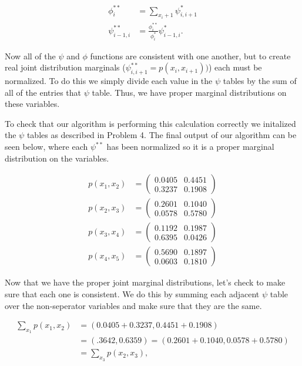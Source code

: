 \documentclass[paper=a4, fontsize=11pt]{scrartcl} %
\begin{document}
\begin{align}
\phi_i^{**} &= \sum_{x_{i}+1} \psi_{i,i+1}^{*} \\
\psi_{i-1,i}^{**} &= \frac{\phi_i^{**}}{\phi_i^*}\psi_{i-1,i}^*.
\end{align}

Now all of the $\psi$ and  $\phi$ functions are consistent with one another, but to create real joint distribution marginals ($\psi^{**}_{i,i+1} = p(x_i,x_{i+1}))$) each must be normalized.
To do this we simply divide each value in the $\psi$ tables by the sum of all of the entries that $\psi$ table.
Thus, we have proper marginal distributions on these variables.

To check that our algorithm is performing this calculation correctly we initalized the $\psi$ tables as described in Problem 4.
The final output of our algorithm can be seen below, where each $\psi^{**}$ has been normalized so it is a proper marginal distribution on the variables.

\begin{align}
p(x_1,x_2) &=
	\begin{pmatrix}
	0.0405 & 0.4451 \\
	0.3237 & 0.1908
	\end{pmatrix} \\
p(x_2,x_3) &=
	\begin{pmatrix}
	0.2601 & 0.1040 \\
    	0.0578 & 0.5780
	\end{pmatrix} \\
p(x_3,x_4) &=
	\begin{pmatrix}
	0.1192  &  0.1987 \\
    	0.6395   & 0.0426
	\end{pmatrix} \\
p(x_4,x_5) &=
	\begin{pmatrix}
	0.5690  &  0.1897 \\
    	0.0603  &  0.1810
	\end{pmatrix}
\end{align}

Now that we have the proper joint marginal distributions, let's check to make sure that each one is consistent.
We do this by summing each adjacent $\psi$ table over the non-seperator variables and make sure that they are the same.

\begin{align}
\sum_{x_1} p(x_1,x_2) &= (0.0405+0.3237,0.4451+0.1908) \\
&= (.3642,0.6359) = (0.2601+0.1040,0.0578+0.5780) \\ 
&= \sum_{x_3} p(x_2,x_3),
\end{align}
\end{document}
